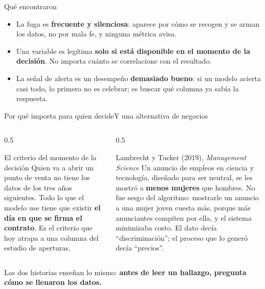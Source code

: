 \documentclass{beamer}
\begin{document}
\begin{frame}{Qué encontraron}
\begin{itemize}\itemsep6pt
  \item La fuga es \textbf{frecuente y silenciosa}: aparece por cómo se recogen y se arman los datos, no por mala fe, y ninguna métrica avisa.
  \item Una variable es legítima \textbf{solo si está disponible en el momento de la decisión}. No importa cuánto se correlacione con el resultado.
  \item La señal de alerta es un desempeño \textbf{demasiado bueno}: si un modelo acierta casi todo, lo primero no es celebrar; es buscar qué columna ya sabía la respuesta.
\end{itemize}
\medskip
{}
\end{frame}

\begin{frame}{Por qué importa para quien decide}{Y una alternativa de negocios}
\begin{columns}[T]
\begin{column}{0.5\textwidth}
\begin{block}{El criterio del momento de la decisión}
Quien va a abrir un punto de venta no tiene los datos de los tres años siguientes. Todo lo que el modelo use tiene que existir \textbf{el día en que se firma el contrato}. Es el criterio que hoy atrapa a una columna del estudio de aperturas.
\end{block}
\end{column}
\begin{column}{0.5\textwidth}
\begin{exampleblock}{Lambrecht y Tucker (2019), \emph{Management Science}}
Un anuncio de empleos en ciencia y tecnología, diseñado para ser neutral, se les mostró a \textbf{menos mujeres} que hombres. No fue sesgo del algoritmo: mostrarle un anuncio a una mujer joven cuesta más, porque más anunciantes compiten por ella, y el sistema minimizaba costo. El dato decía ``discriminación''; el proceso que lo generó decía ``precios''.
\end{exampleblock}
\end{column}
\end{columns}
\smallskip
\small Las dos historias enseñan lo mismo: \textbf{antes de leer un hallazgo, pregunta cómo se llenaron los datos.}
\end{frame}
\end{document}
